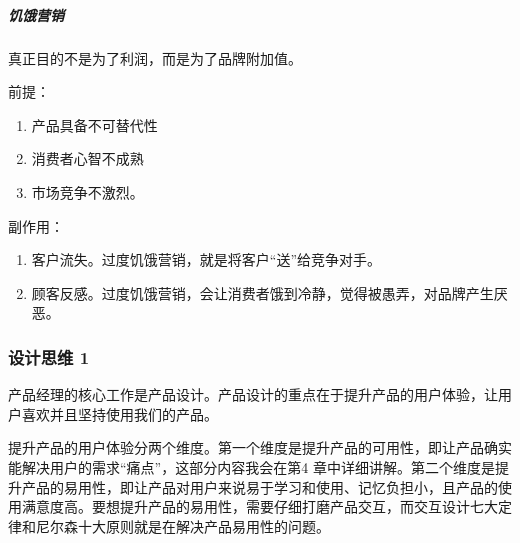 \documentclass[letterpaper,11pt,english]{sphinxmanual}
\begin{document}
\subparagraph{饥饿营销}
\label{\detokenize{chapter_idea/yunyingxiao:id5}}
真正目的不是为了利润，而是为了品牌附加值。

前提：
\begin{enumerate}
%
\item {} 
产品具备不可替代性

\item {} 
消费者心智不成熟

\item {} 
市场竞争不激烈。

\end{enumerate}

副作用：
\begin{enumerate}
%
\item {} 
客户流失。过度饥饿营销，就是将客户“送”给竞争对手。

\item {} 
顾客反感。过度饥饿营销，会让消费者饿到冷静，觉得被愚弄，对品牌产生厌恶。

\end{enumerate}


\subsubsection{设计思维 1\sphinxfootnotemark[138]}
\label{\detokenize{chapter_idea/design:id1}}\label{\detokenize{chapter_idea/design::doc}}%
\begin{footnotetext}[138]\sphinxAtStartFootnote
{}
%
\end{footnotetext}\ignorespaces 
产品经理的核心工作是产品设计。产品设计的重点在于提升产品的用户体验，让用户喜欢并且坚持使用我们的产品。

提升产品的用户体验分两个维度。第一个维度是提升产品的可用性，即让产品确实能解决用户的需求“痛点”，这部分内容我会在第4
章中详细讲解。第二个维度是提升产品的易用性，即让产品对用户来说易于学习和使用、记忆负担小，且产品的使用满意度高。要想提升产品的易用性，需要仔细打磨产品交互，而交互设计七大定律和尼尔森十大原则就是在解决产品易用性的问题。
\end{document}
